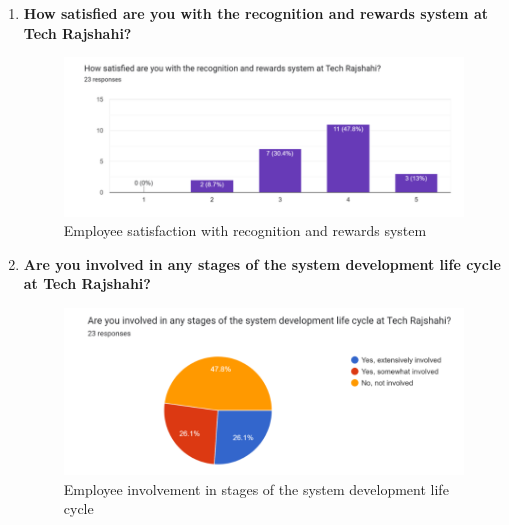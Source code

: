 \documentclass[12pt,a4paper]{article}
\begin{document}
\begin{enumerate}
    \item \textbf{How satisfied are you with the recognition and rewards system at Tech Rajshahi?}  
    \begin{figure}[H]
        \centering
        \includegraphics[width=\textwidth]{Fig/rs.png}
        \caption{Employee satisfaction with recognition and rewards system}
        \label{fig:recognition_rewards}
    \end{figure}

    \item \textbf{Are you involved in any stages of the system development life cycle at Tech Rajshahi?}  
    \begin{figure}[H]
        \centering
        \includegraphics[width=\textwidth]{Fig/sdlc.png}
        \caption{Employee involvement in stages of the system development life cycle}
        \label{fig:sdlc_involvement}
    \end{figure}


\end{enumerate}
\end{document}
